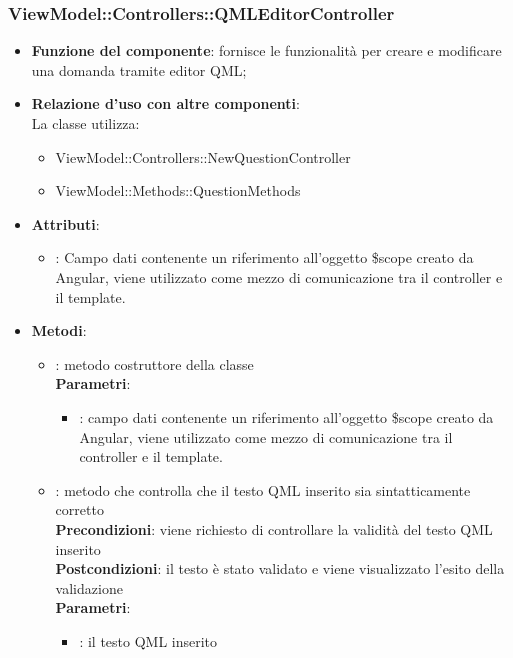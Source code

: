 \subsubsection{ViewModel::Controllers::QMLEditorController}
\begin{itemize}
\item\textbf{Funzione del componente}: fornisce le funzionalità per creare e modificare una domanda tramite editor QML;
	\item\textbf{Relazione d'uso con altre componenti}: \\
La classe utilizza:
	\begin{itemize}
		\item ViewModel::Controllers::NewQuestionController
		\item ViewModel::Methods::QuestionMethods
	\end{itemize}
\item\textbf{Attributi}:
	\begin{itemize}
		\item{}: Campo dati contenente un riferimento all’oggetto \$scope creato da Angular, viene utilizzato come mezzo di comunicazione tra il controller e il template.\\
	\end{itemize}
\item\textbf{Metodi}:
	\begin{itemize}
		\item{}: metodo costruttore della classe\\
		\textbf{Parametri}:
			\begin{itemize}
				\item{}: campo dati contenente un riferimento all’oggetto \$scope creato da Angular, viene utilizzato come mezzo di comunicazione tra il controller e il template.\\
			\end{itemize}
		\item{}: metodo che controlla che il testo QML inserito sia sintatticamente corretto\\
		\textbf{Precondizioni}: viene richiesto di controllare la validità del testo QML inserito\\
		\textbf{Postcondizioni}: il testo è stato validato e viene visualizzato l'esito della validazione\\
		\textbf{Parametri}:
			\begin{itemize}
				\item{}: il testo QML inserito\\
			\end{itemize}
	\end{itemize}
\end{itemize}


